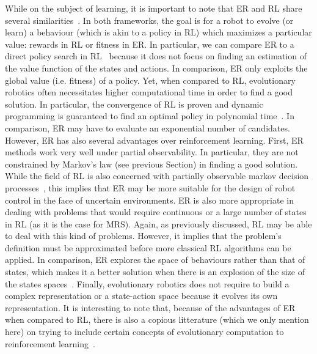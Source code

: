   While on the subject of learning, it is important to note that ER and RL share several similarities~\parencite{Whiteson2012, Doncieux2015a}. In both frameworks, the goal is for a robot to evolve (or learn) a behaviour (which is akin to a policy in RL) which maximizes a particular value: rewards in RL or fitness in ER. In particular, we can compare ER to a direct policy search in RL~\parencite{Kober2013} because it does not focus on finding an estimation of the value function of the states and actions. In comparison, ER only exploits the global value (i.e. fitness) of a policy. Yet, when compared to RL, evolutionary robotics often necessitates higher computational time in order to find a good solution. In particular, the convergence of RL is proven and dynamic programming is guaranteed to find an optimal policy in polynomial time~\parencite{Littman1994, Whiteson2012}. In comparison, ER may have to evaluate an exponential number of candidates. However, ER has also several advantages over reinforcement learning. First, ER methods work very well under partial observability. In particular, they are not constrained by Markov's law (see previous Section) in finding a good solution. While the field of RL is also concerned with partially observable markov decision processes~\parencite{Jaakkola1994}, this implies that ER may be more suitable for the design of robot control in the face of uncertain environments. ER is also more appropriate in dealing with problems that would require continuous or a large number of states in RL (as it is the case for MRS). Again, as previously discussed, RL may be able to deal with this kind of problems. However, it implies that the problem's definition must be approximated before more classical RL algorithms can be applied. In comparison, ER explores the space of behaviours rather than that of states, which makes it a better solution when there is an explosion of the size of the states spaces~\parencite{Panait2005}. Finally, evolutionary robotics does not require to build a complex representation or a state-action space because it evolves its own representation. It is interesting to note that, because of the advantages of ER when compared to RL, there is also a copious litterature (which we only mention here) on trying to include certain concepts of evolutionary computation to reinforcement learning~\parencite{Whiteson2012}.

